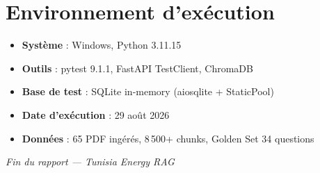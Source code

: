 \documentclass[12pt,a4paper,oneside]{report}
\begin{document}
\section{Environnement d'ex\'{e}cution}

\begin{itemize}[leftmargin=1.2cm]
\item \textbf{Syst\`{e}me} : Windows, Python 3.11.15
\item \textbf{Outils} : pytest 9.1.1, FastAPI TestClient, ChromaDB
\item \textbf{Base de test} : SQLite in-memory (aiosqlite + StaticPool)
\item \textbf{Date d'ex\'{e}cution} : 29 ao\^{u}t 2026
\item \textbf{Donn\'{e}es} : 65 PDF ing\'{e}r\'{e}s, 8\,500+ chunks, Golden Set 34 questions
\end{itemize}

\vfill
\begin{center}
\textit{Fin du rapport --- Tunisia Energy RAG}
\end{center}
\end{document}
